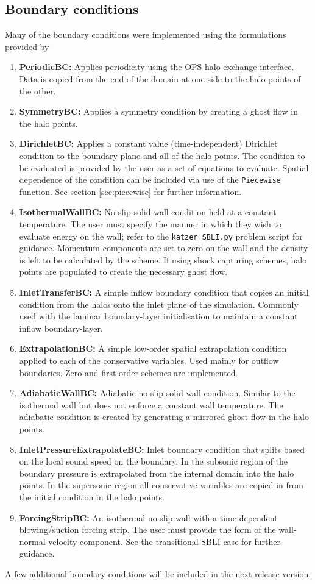 \documentclass[11pt]{article}
\begin{document}
\subsection{Boundary conditions}
Many of the boundary conditions were implemented using the formulations provided by 
\begin{enumerate}
\item{\textbf{PeriodicBC:} Applies periodicity using the OPS halo exchange interface. Data is copied from the end of the domain at one side to the halo points of the other.}
\item{\textbf{SymmetryBC:} Applies a symmetry condition by creating a ghost flow in the halo points.}
\item{\textbf{DirichletBC:} Applies a constant value (time-independent) Dirichlet condition to the boundary plane and all of the halo points. The condition to be evaluated is provided by the user as a set of equations to evaluate. Spatial dependence of the condition can be included via use of the \verb|Piecewise| function. See section \ref{sec:piecewise} for further information.}
\item{\textbf{IsothermalWallBC:} No-slip solid wall condition held at a constant temperature. The user must specify the manner in which they wish to evaluate energy on the wall; refer to the \verb|katzer_SBLI.py| problem script for guidance. Momentum components are set to zero on the wall and the density is left to be calculated by the scheme. If using shock capturing schemes, halo points are populated to create the necessary ghost flow.}
\item{\textbf{InletTransferBC:} A simple inflow boundary condition that copies an initial condition from the halos onto the inlet plane of the simulation. Commonly used with the laminar boundary-layer initialisation to maintain a constant inflow boundary-layer.}
\item{\textbf{ExtrapolationBC:} A simple low-order spatial extrapolation condition applied to each of the conservative variables. Used mainly for outflow boundaries. Zero and first order schemes are implemented.}
\item{\textbf{AdiabaticWallBC:} Adiabatic no-slip solid wall condition. Similar to the isothermal wall but does not enforce a constant wall temperature. The adiabatic condition is created by generating a mirrored ghost flow in the halo points.}
\item{\textbf{InletPressureExtrapolateBC:} Inlet boundary condition that splits based on the local sound speed on the boundary. In the subsonic region of the boundary pressure is extrapolated from the internal domain into the halo points. In the supersonic region all conservative variables are copied in from the initial condition in the halo points.}
\item{\textbf{ForcingStripBC:} An isothermal no-slip wall with a time-dependent blowing/suction forcing strip. The user must provide the form of the wall-normal velocity component. See the transitional SBLI case for further guidance.}
\end{enumerate}
A few additional boundary conditions will be included in the next release version.
\end{document}

